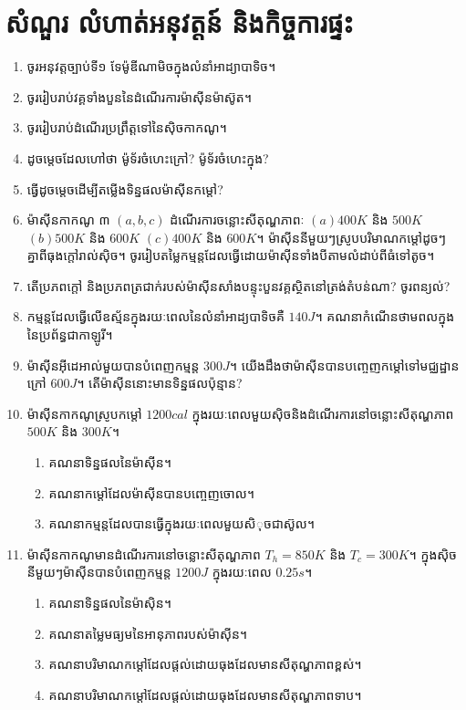 	\section{សំណួរ លំហាត់អនុវត្តន៍ និងកិច្ចការផ្ទះ}
	\begin{enumerate}
		\item ចូរអនុវត្តច្បាប់ទី១ ទែម៉ូឌីណាមិចក្នុងលំនាំអាដ្យាបាទិច។
		\item ចូររៀបរាប់វគ្គទាំងបួននៃដំណើរការម៉ាសុីនម៉ាស៊ូត។
		\item ចូររៀបរាប់ដំណើរប្រព្រឹត្តទៅនៃសុិចកាកណូ។
		\item ដូចម្តេចដែលហៅថា ម៉ូទ័រចំហេះក្រៅ? ម៉ូទ័រចំហេះក្នុង?
		\item ធ្វើដូចម្តេចដើម្បីតម្លើងទិន្នផលម៉ាសុីនកម្តៅ?
		\item ម៉ាសុីនកាកណូ ៣ $\left(a,b,c\right)$ ដំណើរការចន្លោះសីតុណ្ហភាពៈ $(a) 400K$ និង $500K$ $\left(b\right) 500K$ និង $600K$ $\left(c\right) 400K$ និង $600K$។ ម៉ាសុីននីមួយៗស្រូបបរិមាណកម្តៅដូចៗគ្នាពីធុងក្តៅរាល់សុិច។ ចូររៀបតម្លៃកម្មន្តដែលធ្វើដោយម៉ាសុីនទាំងបីតាមលំដាប់ពីធំទៅតូច។
		\item តើប្រភពក្តៅ និងប្រភពត្រជាក់របស់ម៉ាសុីនសាំងបន្ទុះបួនវគ្គស្ថិតនៅត្រង់តំបន់ណា? ចូរពន្យល់?
		\item កម្មន្តដែលធ្វើលើឧស្ម័នក្នុងរយៈពេលនៃលំនាំអាដ្យបាទិចគឺ $140J$។ គណនាកំណើនថាមពលក្នុងនៃប្រព័ន្ធជាកាឡូរី។
		\item ម៉ាសុីនអុីដេអាល់មួយបានបំពេញកម្មន្ត $300J$។ យើងដឹងថាម៉ាសុីនបានបញ្ចេញកម្តៅទៅមជ្ឈដ្ឋានក្រៅ $600J$។ តើម៉ាសុីននោះមានទិន្នផលប៉ុន្មាន?
		\item ម៉ាសុីនកាកណូស្រូបកម្តៅ $1200cal$ ក្នុងរយៈពេលមួយសុិចនិងដំណើរការនៅចន្លោះសីតុណ្ហភាព $500K$ និង $300K$។
		\begin{enumerate}
			\item គណនាទិន្នផលនៃម៉ាសុីន។
			\item គណនាកម្តៅដែលម៉ាសុីនបានបញ្ចេញចោល។
			\item គណនាកម្មន្តដែលបានធ្វើក្នុងរយៈពេលមួយសិុចជាស៊ូល។
		\end{enumerate}
		\item ម៉ាសុីនកាកណូមានដំណើរការនៅចន្លោះសីតុណ្ហភាព $T_{h}=850K$ និង $T_{c}=300K$។ ក្នុងសុិចនីមួយៗម៉ាសុីនបានបំពេញកម្មន្ត $1200J$ ក្នុងរយៈពេល $0.25s$។
		\begin{enumerate}
			\item គណនាទិន្នផលនៃម៉ាសុិន។
			\item គណនាតម្លៃមធ្យមនៃអានុភាពរបស់ម៉ាសុីន។
			\item គណនាបរិមាណកម្តៅដែលផ្តល់ដោយធុងដែលមានសីតុណ្ហភាពខ្ពស់។
			\item គណនាបរិមាណកម្តៅដែលផ្តល់ដោយធុងដែលមានសីតុណ្ហភាពទាប។

\end{enumerate}
\end{enumerate}

